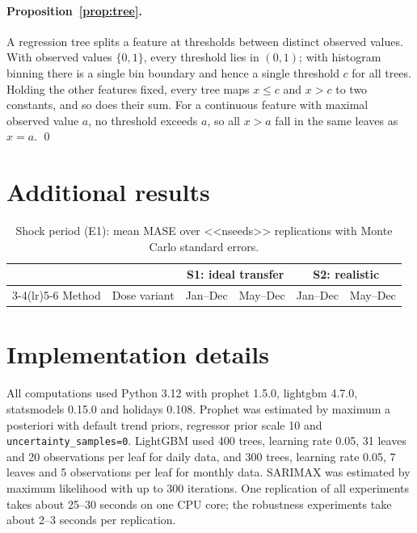 \documentclass{article}
\theoremstyle{plain}
\theoremstyle{definition}
\theoremstyle{remark}
\begin{document}
\paragraph{Proposition~\ref{prop:tree}.} A regression tree splits a feature at thresholds between distinct observed values. With observed values $\{0,1\}$, every threshold lies in $(0,1)$; with histogram binning there is a single bin boundary and hence a single threshold $c$ for all trees. Holding the other features fixed, every tree maps $x\le c$ and $x>c$ to two constants, and so does their sum. For a continuous feature with maximal observed value $a$, no threshold exceeds $a$, so all $x>a$ fall in the same leaves as $x=a$. \qed

\section{Additional results}\label{app:extra}
\begin{table}[h]
\centering
\caption{Shock period (E1): mean MASE over <<nseeds>> replications with Monte Carlo standard errors.}
\label{tab:e1mase}
\scriptsize
\setlength{\tabcolsep}{4pt}
\begin{tabular}{llcccc}
\toprule
 & & \multicolumn{2}{c}{S1: ideal transfer} & \multicolumn{2}{c}{S2: realistic} \\
\cmidrule(lr){3-4}\cmidrule(lr){5-6}
Method & Dose variant & Jan--Dec & May--Dec & Jan--Dec & May--Dec \\
\midrule
\bottomrule
\end{tabular}
\end{table}

\section{Implementation details}\label{app:impl}
All computations used Python 3.12 with prophet 1.5.0, lightgbm 4.7.0, statsmodels 0.15.0 \citep{box2015time} and holidays 0.108. Prophet was estimated by maximum a posteriori with default trend priors, regressor prior scale 10 and \texttt{uncertainty\_samples=0}. LightGBM used 400 trees, learning rate 0.05, 31 leaves and 20 observations per leaf for daily data, and 300 trees, learning rate 0.05, 7 leaves and 5 observations per leaf for monthly data. SARIMAX was estimated by maximum likelihood with up to 300 iterations. One replication of all experiments takes about 25--30 seconds on one CPU core; the robustness experiments take about 2--3 seconds per replication.
\end{document}
